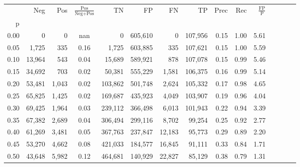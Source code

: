 \begin{tabular}{rrrcrrrrrrrrrrr}
\toprule
{} &     Neg &     Pos & $\frac{\text{Pos}}{\text{Neg}+\text{Pos}}$ &       TN &       FP &       FN &       TP &  Prec &   Rec & $\frac{\text{FP}}{\text{P}}$ \\
p    &         &         &                                            &          &          &          &          &       &       &                              \\
\midrule
0.00 &       0 &       0 &                                        nan &        0 &  605,610 &        0 &  107,956 &  0.15 &  1.00 &                         5.61 \\
0.05 &   1,725 &     335 &                                       0.16 &    1,725 &  603,885 &      335 &  107,621 &  0.15 &  1.00 &                         5.59 \\
0.10 &  13,964 &     543 &                                       0.04 &   15,689 &  589,921 &      878 &  107,078 &  0.15 &  0.99 &                         5.46 \\
0.15 &  34,692 &     703 &                                       0.02 &   50,381 &  555,229 &    1,581 &  106,375 &  0.16 &  0.99 &                         5.14 \\
0.20 &  53,481 &   1,043 &                                       0.02 &  103,862 &  501,748 &    2,624 &  105,332 &  0.17 &  0.98 &                         4.65 \\
0.25 &  65,825 &   1,425 &                                       0.02 &  169,687 &  435,923 &    4,049 &  103,907 &  0.19 &  0.96 &                         4.04 \\
0.30 &  69,425 &   1,964 &                                       0.03 &  239,112 &  366,498 &    6,013 &  101,943 &  0.22 &  0.94 &                         3.39 \\
0.35 &  67,382 &   2,689 &                                       0.04 &  306,494 &  299,116 &    8,702 &   99,254 &  0.25 &  0.92 &                         2.77 \\
0.40 &  61,269 &   3,481 &                                       0.05 &  367,763 &  237,847 &   12,183 &   95,773 &  0.29 &  0.89 &                         2.20 \\
0.45 &  53,270 &   4,662 &                                       0.08 &  421,033 &  184,577 &   16,845 &   91,111 &  0.33 &  0.84 &                         1.71 \\
0.50 &  43,648 &   5,982 &                                       0.12 &  464,681 &  140,929 &   22,827 &   85,129 &  0.38 &  0.79 &                         1.31 \\

\end{tabular}
